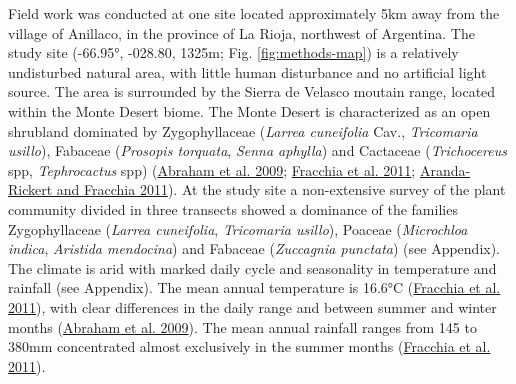 \documentclass[english,msc,numbers,hidelinks]{coppe}
\begin{document}
  Field work was conducted at one site located approximately 5km away from the village of Anillaco, in the province of La Rioja, northwest of Argentina. The study site (-66.95°, -028.80, 1325m; Fig. \ref{fig:methods-map}) is a relatively undisturbed natural area, with little human disturbance and no artificial light source. The area is surrounded by the Sierra de Velasco moutain range, located within the Monte Desert biome. The Monte Desert is characterized as an open shrubland dominated by Zygophyllaceae (\emph{Larrea cuneifolia} Cav., \emph{Tricomaria usillo}), Fabaceae (\emph{Prosopis torquata}, \emph{Senna aphylla}) and Cactaceae (\emph{Trichocereus} spp, \emph{Tephrocactus} spp) (\protect\hyperlink{ref-abraham2009}{Abraham et al. 2009}; \protect\hyperlink{ref-fracchia2011}{Fracchia et al. 2011}; \protect\hyperlink{ref-aranda-rickert2011a}{Aranda-Rickert and Fracchia 2011}). At the study site a non-extensive survey of the plant community divided in three transects showed a dominance of the families Zygophyllaceae (\emph{Larrea cuneifolia}, \emph{Tricomaria usillo}), Poaceae (\emph{Microchloa indica}, \emph{Aristida mendocina}) and Fabaceae (\emph{Zuccagnia punctata}) (see Appendix). The climate is arid with marked daily cycle and seasonality in temperature and rainfall (see Appendix). The mean annual temperature is 16.6°C (\protect\hyperlink{ref-fracchia2011}{Fracchia et al. 2011}), with clear differences in the daily range and between summer and winter months (\protect\hyperlink{ref-abraham2009}{Abraham et al. 2009}). The mean annual rainfall ranges from 145 to 380mm concentrated almost exclusively in the summer months (\protect\hyperlink{ref-fracchia2011}{Fracchia et al. 2011}).
\end{document}
